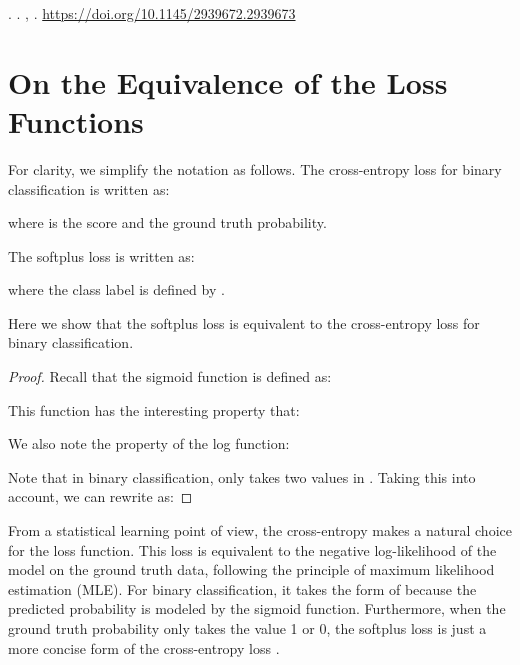 \documentclass[sigconf,edbt]{acmart-edbt2019}
\begin{document}
\begin{thebibliography}{36}
  \natexlab{}.
\newblock {}. ,
  .
\newblock
{}
\urldef\tempurl \url{https://doi.org/10.1145/2939672.2939673}
\showDOI{\tempurl}


\end{thebibliography}
 

\newpage


\appendix
\section{On the Equivalence of the Loss Functions}
For clarity, we simplify the notation as follows. The cross-entropy loss for binary classification is written as:

where  is the score and  the ground truth probability.

The softplus loss is written as:

where the class label  is defined by .

Here we show that the softplus loss is equivalent to the cross-entropy loss for binary classification.

\begin{proof}
Recall that the sigmoid function is defined as:


This function has the interesting property that:


We also note the property of the log function:


Note that in binary classification,  only takes two values in . Taking this into account, we can rewrite  as:

\end{proof}

From a statistical learning point of view, the cross-entropy makes a natural choice for the loss function. This loss is equivalent to the negative log-likelihood of the model on the ground truth data, following the principle of maximum likelihood estimation (MLE). For binary classification, it takes the form of  because the predicted probability is modeled by the sigmoid function. Furthermore, when the ground truth probability only takes the value 1 or 0, the softplus loss  is just a more concise form of the cross-entropy loss .
\end{document}
